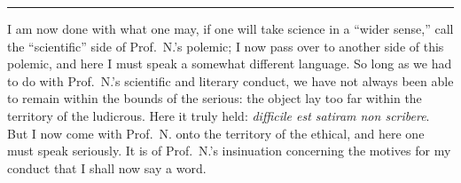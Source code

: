 \documentclass[12pt,a4paper]{book}
\begin{document}
\begin{center}\rule{2cm}{0.4pt}\end{center}

I am now done with what one may, if one will take science in a ``wider sense,''
call the ``scientific'' side of Prof.\ N.'s polemic; I now pass over
to another side of this polemic, and here I must speak a somewhat different
language. So long as we had to do with Prof.\ N.'s scientific and literary
conduct, we have not always been able to remain within the bounds of the serious:
the object lay too far within the territory of the ludicrous. Here it truly held:
\textit{difficile est satiram non scribere}. But I now come with Prof.\ N. onto
the territory of the ethical, and here one must speak seriously. It is of Prof.\
N.'s insinuation concerning the motives for my conduct that I shall now say a
word.
\end{document}
